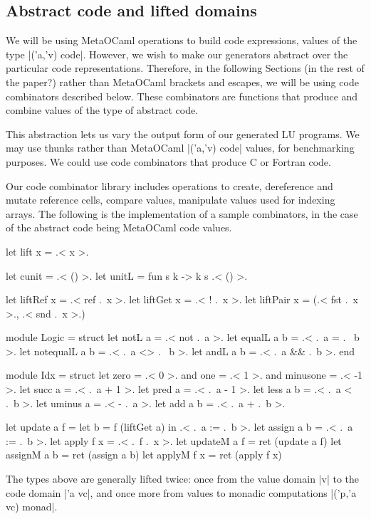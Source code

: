 \documentclass[draft]{elsart}
\begin{document}
\subsection{Abstract code and lifted domains}
We will be using MetaOCaml operations to build code expressions, values
of the type |('a,'v) code|. However, we wish to make our generators
abstract over the particular code representations. Therefore, in the
following Sections (in the rest of the paper?) rather than 
MetaOCaml brackets and escapes, we will be using code combinators
described below. These combinators are functions that produce and
combine values of the type of abstract code. 

This abstraction lets us vary the output form of our generated LU
programs. We may use thunks rather than MetaOCaml |('a,'v) code|
values, for benchmarking purposes. We could use code combinators that
produce C or Fortran code.

Our code combinator library includes operations to create, dereference
and mutate reference cells, compare values, manipulate values used
for indexing arrays. The following is the implementation of a sample
combinators, in the case of the abstract code being MetaOCaml code values. 
\begin{code}
let lift x = .< x >.

let cunit = .< () >.
let unitL = fun s k -> k s .< () >.

let liftRef x = .< ref .~x >. 
let liftGet x = .< ! .~x >. 
let liftPair x = (.< fst .~x >., .< snd .~x >.)

module Logic = struct
  let notL a        = .< not .~a >.
  let equalL a b    = .< .~a = .~ b >.
  let notequalL a b = .< .~a <> .~ b >.
  let andL a b     = .< .~a && .~b >. 
end

module Idx = struct
  let zero = .< 0 >. and one = .< 1 >. and minusone = .< -1 >.
  let succ a = .< .~a + 1 >.
  let pred a = .< .~a - 1 >.
  let less a b = .< .~a < .~b >.
  let uminus a = .< - .~a >.
  let add a b = .< .~a + .~b >.

let update a f = let b = f (liftGet a) in .< .~a := .~b >.
let assign a b = .< .~a := .~b >.
let apply  f x = .< .~f .~x >.
let updateM a f = ret (update a f)
let assignM a b = ret (assign a b)
let applyM  f x = ret (apply f x)
\end{code}


\noindent  The types above are
generally lifted twice: once from the value domain |v| to the code
domain |'a vc|, and once more from values to monadic computations
|('p,'a vc) monad|. 
\end{document}
